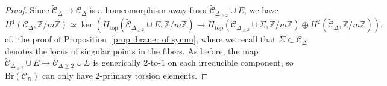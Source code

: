 \documentclass[11pt]{amsart}
\theoremstyle{plain}
\theoremstyle{definition}
\theoremstyle{remark}
\begin{document}
\begin{proof}
Since $\widetilde{\mathcal C}_{\Delta} \to \mathcal C_\Delta$ is a homeomorphism away from $\widetilde{\mathcal C}_{\Delta_{\geq 2}} \cup E$, we have
$$H^1(\mathcal C_{\Delta}, \mathbb Z / m \mathbb Z) \simeq \ker(H_{\mathrm{top}}(\widetilde{\mathcal C}_{\Delta_{\geq 2}} \cup E, \mathbb Z / m \mathbb Z) \to H_{\mathrm{top}}(\mathcal C_{\Delta_{\geq 2}} \cup \Sigma, \mathbb Z / m \mathbb Z) \oplus H^2(\widetilde{\mathcal C}_{\Delta}, \mathbb Z / m \mathbb Z)),$$
cf.\ the proof of Proposition~\ref{prop: brauer of symm},
where we recall that $\Sigma \subset \mathcal C_{\Delta}$ denotes the locus of singular points in the fibers. As before, the map $\widetilde{\mathcal{C}}_{\Delta_{\geq 2}} \cup E \to \mathcal{C}_{\Delta \geq 2} \cup \Sigma$ is generically $2$-to-$1$ on each irreducible component, so $\mathrm{Br}(\mathcal{C}_B)$ can only have $2$-primary torsion elements.


\end{proof}
\end{document}
